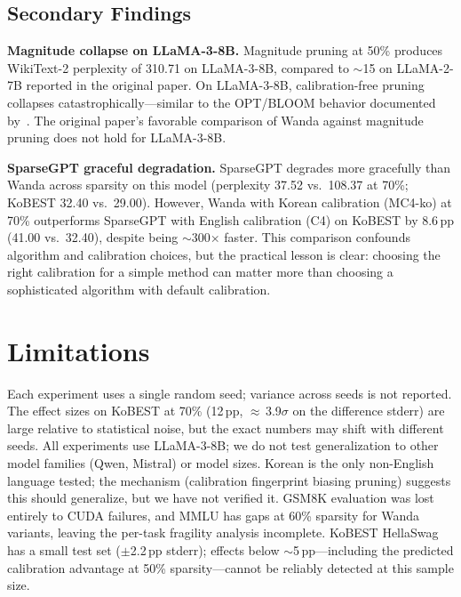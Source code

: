 \documentclass{article}
\begin{document}
\subsection{Secondary Findings}

\textbf{Magnitude collapse on LLaMA-3-8B.}\quad
Magnitude pruning at 50\% produces WikiText-2 perplexity of 310.71 on LLaMA-3-8B, compared to ${\sim}$15 on LLaMA-2-7B reported in the original paper.
On LLaMA-3-8B, calibration-free pruning collapses catastrophically---similar to the OPT/BLOOM behavior documented by~\citet{sun2024wanda}.
The original paper's favorable comparison of Wanda against magnitude pruning does not hold for LLaMA-3-8B.

\textbf{SparseGPT graceful degradation.}\quad
SparseGPT degrades more gracefully than Wanda across sparsity on this model (perplexity 37.52 vs.\ 108.37 at 70\%; KoBEST 32.40 vs.\ 29.00).
However, Wanda with Korean calibration (MC4-ko) at 70\% outperforms SparseGPT with English calibration (C4) on KoBEST by 8.6\,pp (41.00 vs.\ 32.40), despite being ${\sim}$300$\times$ faster.
This comparison confounds algorithm and calibration choices, but the practical lesson is clear: choosing the right calibration for a simple method can matter more than choosing a sophisticated algorithm with default calibration.

\section{Limitations}
\label{sec:limitations}

Each experiment uses a single random seed; variance across seeds is not reported.
The effect sizes on KoBEST at 70\% (12\,pp, ${\approx}$\,3.9$\sigma$ on the difference stderr) are large relative to statistical noise, but the exact numbers may shift with different seeds.
All experiments use LLaMA-3-8B; we do not test generalization to other model families (Qwen, Mistral) or model sizes.
Korean is the only non-English language tested; the mechanism (calibration fingerprint biasing pruning) suggests this should generalize, but we have not verified it.
GSM8K evaluation was lost entirely to CUDA failures, and MMLU has gaps at 60\% sparsity for Wanda variants, leaving the per-task fragility analysis incomplete.
KoBEST HellaSwag has a small test set ($\pm$2.2\,pp stderr); effects below ${\sim}$5\,pp---including the predicted calibration advantage at 50\% sparsity---cannot be reliably detected at this sample size.
\end{document}
